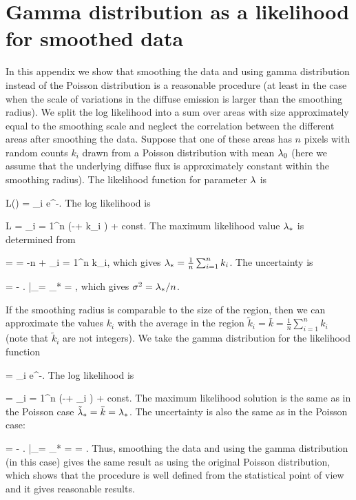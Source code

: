 \newpage
\section{Gamma distribution as a likelihood for smoothed data}

In this appendix we show that smoothing the data and using gamma distribution instead of the Poisson distribution
is a reasonable procedure (at least in the case when the scale of variations in the diffuse emission is larger than the smoothing radius).
We split the log likelihood into a sum over areas with size approximately equal to the smoothing scale
and neglect the correlation between the different areas after smoothing the data.
Suppose that one of these areas has $n$ pixels with random counts $k_i$ drawn from a Poisson distribution with mean $\lambda_0$
(here we assume that the underlying diffuse flux is approximately constant within the smoothing radius).
The likelihood function for parameter $\lambda$ is

\be
L(\ld) = \prod_i  e^{-\ld}.
\ee
The log likelihood is

\be
\log L = \sum_{i = 1}^n (-\ld + k_i \log \ld) + const.
\ee
The maximum likelihood value $\lambda_*$ is determined from

 =  = -n +  \sum_{i = 1}^n k_i,
\ee
which gives $\lambda_* = \frac{1}{n} \sum_{i = 1}^n k_i$.
The uncertainty is

\be
{} = - \left.  \right|_{\ld = \ld_*} = ,
\ee
which gives $\sigma^2 = \lambda_* / n$.

If the smoothing radius is comparable to the size of the region,
then we can approximate the values $k_i$ with the average in the region $\tilde{k}_i = \bar{k} = \frac{1}{n} \sum_{i = 1}^n k_i$
(note that $\tilde{k}_i$ are not integers).
We take the gamma distribution for the likelihood function 

\be
{} = \prod_i  e^{-\ld}.
\ee
The log likelihood is

\be
\log {} = \sum_{i = 1}^n (-\ld + _i \log \ld) + const.
\ee
The maximum likelihood solution is the same as in the Poisson case $\tilde{\lambda}_* = \bar{k} = {\lambda}_*$.
The uncertainty is also the same as in the Poisson case:

\be
{} = - \left.  \right|_{\ld = \td{\ld}_*} =  = .
\ee
Thus, smoothing the data and using the gamma distribution (in this case) gives the same result as using the original Poisson distribution,
which shows that the procedure is well defined from the statistical point of view and it gives reasonable results.
